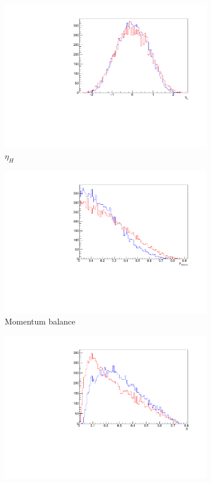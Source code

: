 \begin{figure}[htbp]
\begin{subfigure}[b]{0.3\textwidth}
	                \includegraphics[width=\textwidth]{img/etah}
	                \caption{$\eta_H$}
	                \label{fig:etah}
	\end{subfigure}
	\begin{subfigure}[b]{0.3\textwidth}
	                \includegraphics[width=\textwidth]{img/pbalance}
	                \caption{Momentum balance}
	                \label{fig:pbal}
	\end{subfigure}
	\begin{subfigure}[b]{0.3\textwidth}
	                \includegraphics[width=\textwidth]{img/sphericity}

\end{subfigure}
\end{figure}
